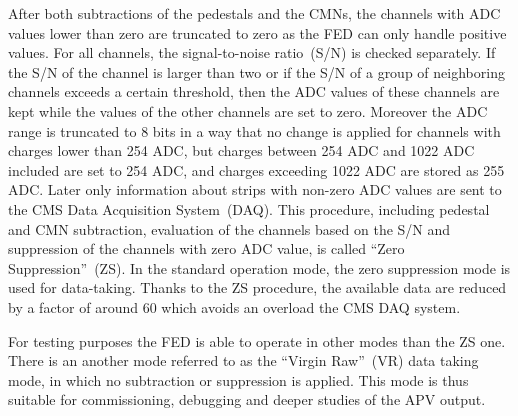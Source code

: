 After both subtractions of the pedestals and the CMNs, the channels with ADC values lower than zero are truncated to zero as the FED can only handle positive values. For all channels, the signal-to-noise ratio~(S/N) is checked separately. If the S/N of the channel is larger than two or if the S/N of a group of neighboring channels exceeds a certain threshold, then the ADC values of these channels are kept while the values of the other channels are set to zero. Moreover the ADC range is truncated to 8 bits in a way that no change is applied for channels with charges lower than 254 ADC, but charges between 254 ADC and 1022 ADC included are set to 254 ADC, and charges exceeding 1022 ADC are stored as 255 ADC. Later only information about strips with non-zero ADC values are sent to the CMS Data Acquisition System~(DAQ).  This procedure, including pedestal and CMN subtraction, evaluation of the channels based on the S/N and suppression of the channels with zero ADC value, is called ``Zero Suppression''~(ZS). In the standard operation mode, the zero suppression mode is used for data-taking. Thanks to the ZS procedure, the available data are reduced by a factor of around 60 which avoids an overload the CMS DAQ system.

For testing purposes the FED is able to operate in other modes than the ZS one. There is an another mode referred to as the ``Virgin Raw''~(VR) data taking mode, in which no subtraction or suppression is applied. This mode is thus suitable for commissioning, debugging and deeper studies of the APV output.





